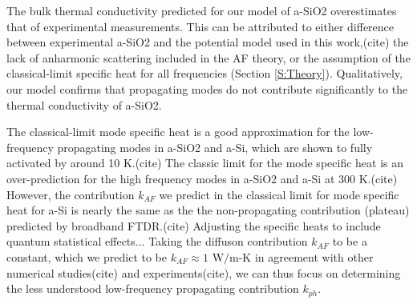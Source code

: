 \documentclass[aps,prb,onecolumn,preprint,superscriptaddress,footinbib,amsmath,amssymb,floatfix]{revtex4}
\begin{document}
The bulk thermal conductivity predicted for our model of a-SiO2 overestimates 
that of experimental measurements.\cite{regner_broadband_2013} This can be 
attributed to either difference between experimental a-SiO2 and the 
potential model used in this work,(cite) the lack of anharmonic scattering 
included in the AF theory,\cite{feldman_thermal_1993} or the assumption 
of the classical-limit specific heat for all frequencies 
(Section \ref{S:Theory}). Qualitatively, 
our model confirms that propagating modes do not contribute significantly 
to the thermal conductivity of a-SiO2.
 
The classical-limit mode specific heat is a good approximation 
for the low-frequency propagating modes in a-SiO2 and a-Si, which are shown to 
fully activated by around 10 K.(cite) 
The classic limit for the mode specific heat is 
an over-prediction for the high frequency modes in a-SiO2 and a-Si at 300 K.(cite) 
However, the contribution $k_{AF}$ we predict in the classical limit 
for mode specific heat for a-Si is nearly the same as the 
the non-propagating contribution (plateau) predicted by broadband FTDR.(cite) 
Adjusting the specific heats to include quantum statistical effects...
Taking the diffuson contribution $k_{AF}$ to be a constant, which we predict 
to be $k_{AF} \approx 1$ W$/$m-K in agreement with other numerical 
studies(cite) and experiments(cite), 
we can thus focus on determining the less understood 
low-frequency propagating 
contribution $k_{ph}$. 
\end{document}
